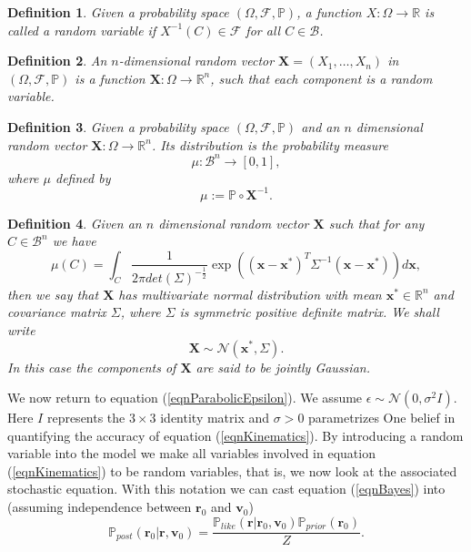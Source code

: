 \documentclass[12pt]{book}
\newtheorem{definition}{Definition}
\newcommand{\post}{\mathbb{P}_{post}}
\newcommand{\like}{\mathbb{P}_{like}}
\newcommand{\prior}{\mathbb{P}_{prior}}
\newcommand{\p}{\mathbb{P}}
\begin{document}
\begin{definition}
Given a probability space $(\Omega,\mathscr{F},\p)$, a function $X:\Omega\rightarrow\mathbb{R}$ is called 
a random variable
if $X^{-1}(C)\in\mathscr{F}$ for all $C\in\mathcal{B}$.
\end{definition}

\begin{definition}
 An $n$-dimensional random vector $\textbf{X}=(X_{1},\ldots,X_{n})$ in $(\Omega,\mathscr{F},\p)$ 
is a function $\textbf{X}:\Omega\rightarrow\mathbb{R}^{n}$, such that each component is a random variable. 
\end{definition}

\begin{definition}
Given a probability space $(\Omega,\mathscr{F},\p)$ and an $n$ dimensional  random vector 
$\mathbf{X}:\Omega\rightarrow\mathbb{R}^{n}$.
Its distribution  is the probability measure
\begin{equation*}
\mu:\mathcal{B}^{n}\rightarrow [0,1],
\end{equation*}
where  $\mu$ defined by 
\begin{equation*}
\mu:=\p\circ \textbf{X}^{-1}.
\end{equation*}
\end{definition}
\begin{definition}\label{dfnrandonvariables}
Given an $n$ dimensional random vector $\mathbf{X}$ such that for any 
$C\in\mathcal{B}^{n}$ we have
\begin{equation}\label{eqnmultivariateGaussianDefinition}
\mu(C)=\int_{C}
\frac{1}{2\pi det(\Sigma)^{-\frac{1}{2}}}\exp((\textbf{x}-\textbf{x}^{*})^{T}\Sigma^{-1}
(\textbf{x}-\textbf{x}^{*}))d\textbf{x},
\end{equation}
then we say
that $\textbf{X}$ has multivariate normal distribution with mean $\textbf{x}^{*}\in\mathbb{R}^{n}$
and covariance matrix $\Sigma$, where $\Sigma$ is symmetric positive definite matrix. We shall write
\begin{equation}\label{eqnMultivariate}
\textbf{X}\sim \mathcal{N}(\textbf{x}^{*},\Sigma).
\end{equation}
In this case the components of $\textbf{X}$ are said to be \textit{jointly Gaussian}.
\end{definition}

We now return to equation (\ref{eqnParabolicEpsilon}). We assume $\epsilon\sim\mathcal{N}(0,\sigma^{2}I)$.
Here $I$
represents the $3\times 3$ identity matrix and $\sigma>0$ parametrizes One belief in quantifying the 
accuracy  
of equation (\ref{eqnKinematics}).  By introducing a random variable into the model
we make all variables involved  in equation (\ref{eqnKinematics})
to be  random variables, that is, we now look at the  associated stochastic equation. With this notation
we can cast equation (\ref{eqnBayes}) into  (assuming independence between $\textbf{r}_{0}$ and $\textbf{v}_{0}$)
\begin{equation}\label{eqnpostrock}
\post(\textbf{r}_{0}|\textbf{r},\textbf{v}_{0})=\frac{\like(\textbf{r}|\textbf{r}_{0},\textbf{v}_{0})
\prior(\textbf{r}_{0})}{Z}.
\end{equation}
\end{document}
